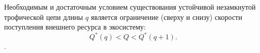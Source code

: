         \begin{corollary}
            Необходимым и достаточным условием существования устойчивой незамкнутой трофической цепи длины \(q\) является ограничение (сверху и снизу) скорости поступления внешнего ресурса в экосистему:
            \begin{equation}
                Q^*(q) < Q < Q^*(q+1).
            \end{equation}.
        \end{corollary}
        



